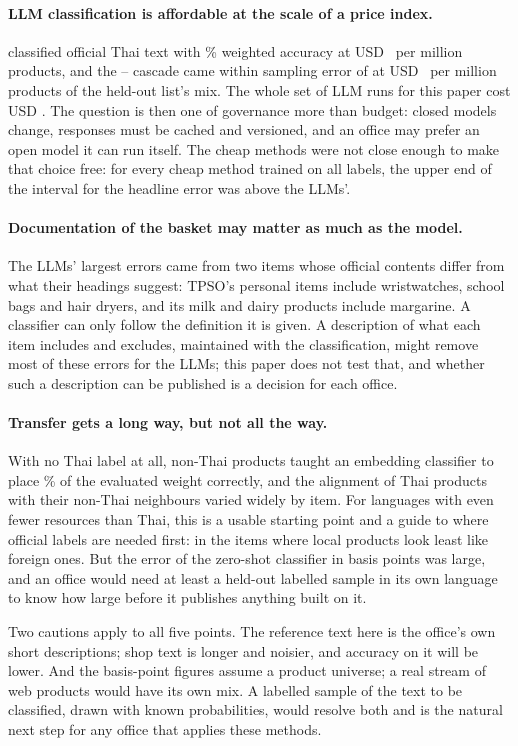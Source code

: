 \paragraph{LLM classification is affordable at the scale of a price index.} \NameHaiku{}
classified official Thai text with \AccWHaiku\% weighted accuracy at USD~\CostHaiku{} per
million products, and the \NameEfive{}--\NameOpus{} cascade came within sampling error of
\NameOpus{} at USD~\CostCasEfiveMLPOpus{} per million products of the held-out list's mix. The whole set of LLM runs for this paper cost USD
\LLMSpendUSD. The question is then one of governance more than budget: closed models
change, responses must be cached and versioned, and an office may prefer an open model it
can run itself. The cheap methods were not close enough to make that choice free: for every cheap
method trained on all labels, the upper end of the interval for the headline error was above
the LLMs'.

\paragraph{Documentation of the basket may matter as much as the model.} The LLMs' largest
errors came from two items whose official contents differ from what their headings suggest:
TPSO's personal items include wristwatches, school bags and hair dryers, and its milk and
dairy products include margarine. A classifier can only follow the definition it is given.
A description of what each item includes and excludes, maintained with the classification,
might remove most of these errors for the LLMs; this paper does not test that, and whether
such a description can be published is a decision for each office.

\paragraph{Transfer gets a long way, but not all the way.} With no Thai label at all,
non-Thai products taught an embedding classifier to place \AccWEfiveMLPZeroShot\% of the
evaluated weight correctly, and the alignment of Thai products with their non-Thai neighbours varied
widely by item. For languages with even fewer resources than Thai, this is a usable
starting point and a guide to where official labels are needed first: in the items where
local products look least like foreign ones. But the error of the zero-shot classifier in
basis points was large, and an office would need at least a held-out labelled sample in
its own language to know how large before it publishes anything built on it.

Two cautions apply to all five points. The reference text here is the office's own short
descriptions; shop text is longer and noisier, and accuracy on it will be lower. And the
basis-point figures assume a product universe; a real stream of web products would have its
own mix. A labelled sample of the text to be classified, drawn with known probabilities,
would resolve both and is the natural next step for any office that applies these methods.
